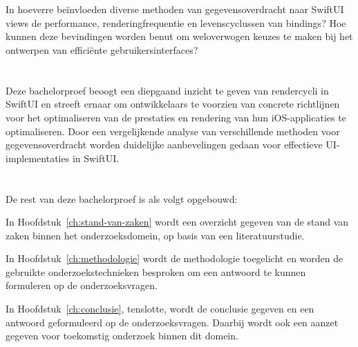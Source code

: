 \section{}%
\label{sec:onderzoeksvraag}
In hoeverre beïnvloeden diverse methoden van
gegevensoverdracht naar SwiftUI views de performance,
renderingfrequentie en levenscyclussen
van bindings? Hoe kunnen deze bevindingen
worden benut om weloverwogen keuzes te maken
bij het ontwerpen van efficiënte gebruikersinterfaces?

\section{}%
\label{sec:onderzoeksdoelstelling}


Deze bachelorproef beoogt een diepgaand inzicht te geven
van rendercycli in SwiftUI en streeft ernaar
om ontwikkelaars te voorzien van concrete
richtlijnen voor het optimaliseren van de prestaties
en rendering van hun iOS-applicaties te optimaliseren. Door
een vergelijkende analyse van verschillende
methoden voor gegevensoverdracht worden duidelijke aanbevelingen gedaan voor effectieve UI-implementaties
in SwiftUI.
\section{}%
\label{sec:opzet-bachelorproef}


De rest van deze bachelorproef is als volgt opgebouwd:

In Hoofdstuk~\ref{ch:stand-van-zaken} wordt een overzicht gegeven van de stand van zaken binnen het onderzoeksdomein, op basis van een literatuurstudie.

In Hoofdstuk~\ref{ch:methodologie} wordt de methodologie toegelicht en worden de gebruikte onderzoekstechnieken besproken om een antwoord te kunnen formuleren op de onderzoeksvragen.


In Hoofdstuk~\ref{ch:conclusie}, tenslotte, wordt de conclusie gegeven en een antwoord geformuleerd op de onderzoeksvragen. Daarbij wordt ook een aanzet gegeven voor toekomstig onderzoek binnen dit domein.